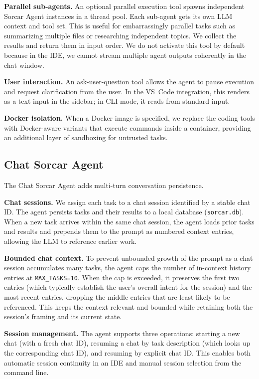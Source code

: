 \documentclass{article}
\begin{document}
\textbf{Parallel sub-agents.}  An optional parallel execution tool spawns independent Sorcar Agent instances in a thread pool.  Each sub-agent gets its own LLM context and tool set.  This is useful for embarrassingly parallel tasks such as summarizing multiple files or researching independent topics.  We collect the results and return them in input order.  We do not activate this tool by default because in the IDE, we cannot stream multiple agent outputs coherently in the chat window.

\textbf{User interaction.}  An ask-user-question tool allows the agent to pause execution and request clarification from the user.  In the VS~Code integration, this renders as a text input in the sidebar; in CLI mode, it reads from standard input.

\textbf{Docker isolation.}  When a Docker image is specified, we replace the coding tools with Docker-aware variants that execute commands inside a container, providing an additional layer of sandboxing for untrusted tasks.

\subsection{Chat Sorcar Agent}
\label{sec:chat-agent}

The Chat Sorcar Agent adds multi-turn conversation persistence.

\textbf{Chat sessions.}  We assign each task to a chat session identified by a stable chat ID.  The agent persists tasks and their results to a local database (\texttt{sorcar.db}).  When a new task arrives within the same chat session, the agent loads prior tasks and results and prepends them to the prompt as numbered context entries, allowing the LLM to reference earlier work.

\textbf{Bounded chat context.}  To prevent unbounded growth of the prompt as a chat session accumulates many tasks, the agent caps the number of in-context history entries at \texttt{MAX\_TASKS=10}.  When the cap is exceeded, it preserves the first two entries (which typically establish the user's overall intent for the session) and the most recent entries, dropping the middle entries that are least likely to be referenced.  This keeps the context relevant and bounded while retaining both the session's framing and its current state.

\textbf{Session management.}  The agent supports three operations: starting a new chat (with a fresh chat ID), resuming a chat by task description (which looks up the corresponding chat ID), and resuming by explicit chat ID.  This enables both automatic session continuity in an IDE and manual session selection from the command line.
\end{document}
